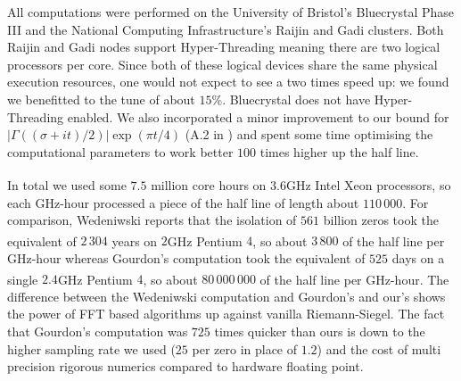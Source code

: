 \documentclass[12pt]{article}
\begin{document}
All computations were performed on the University of Bristol's Bluecrystal Phase III \cite{ACRC} and the National Computing Infrastructure's Raijin and Gadi \cite{NCI} clusters. Both Raijin and Gadi nodes support Hyper-Threading meaning there are two logical processors per core. Since both of these logical devices share the same physical execution resources, one would not expect to see a two times speed up: we found we benefitted to the tune of about $15\%$. Bluecrystal does not have Hyper-Threading enabled. We also incorporated a minor improvement to our bound for $|\Gamma((\sigma+it)/2)|\exp(\pi t/4)$ (A.2 in \cite{Platt}) and spent some time optimising the computational parameters to work better $100$ times higher up the half line.  

In total we used some $7.5$ million core hours on $3.6$GHz Intel\textsuperscript{\textregistered} Xeon\textsuperscript{\textregistered} processors, so each GHz-hour processed a piece of the half line of length about $110\,000$. For comparison, Wedeniwski \cite{Wedeniwski} reports that the isolation of $561$ billion zeros took the equivalent of $2\,304$ years on $2$GHz Pentium\textsuperscript{\textregistered} $4$, so about $3\,800$ of the half line per GHz-hour whereas Gourdon's computation took the equivalent of $525$ days on a single $2.4$GHz Pentium\textsuperscript{\textregistered} $4$, so about $80\,000\,000$ of the half line per GHz-hour. The difference between the Wedeniwski computation and Gourdon's and our's shows the power of FFT based algorithms up against vanilla Riemann-Siegel. The fact that Gourdon's computation was $725$ times quicker than ours is down to the higher sampling rate we used ($25$ per zero in place of $1.2$) and the cost of multi precision rigorous numerics compared to hardware floating point. 

\end{document}

